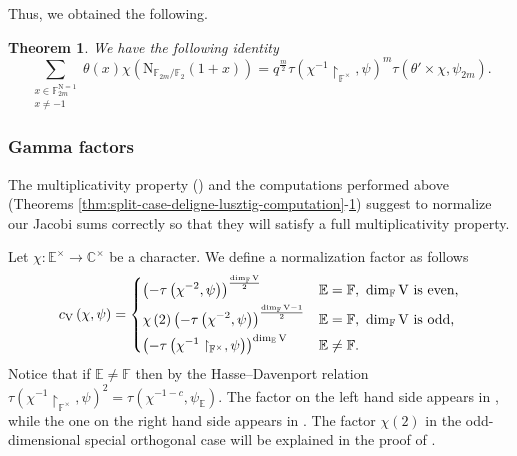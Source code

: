 \documentclass[12pt, reqno]{amsart}
\newtheorem{theorem}{Theorem}[section]
\theoremstyle{definition}
\theoremstyle{definition}
\theoremstyle{definition}
\newcommand{\cComplex}{\mathbb{C}}
\newcommand{\multiplicativegroup}[1]{#1^{\times}}
\newcommand{\hermitianSpace}{\mathrm{V}}
\newcommand{\fieldCharacter}{\psi}
\newcommand{\minusInvolutionMinusOne}[1]{#1^{-1-c}}
\newcommand{\aFieldNorm}{\mathrm{N}}
\newcommand{\finiteField}{\mathbb{F}}
\newcommand{\quadraticExtension}{\mathbb{E}}
\newcommand{\finiteFieldExtension}[1]{\finiteField_{#1}}
\newcommand{\NormOneGroup}[1]{\finiteFieldExtension{#1}^{\aFieldNorm = 1}}
\newcommand{\GaussSumSingleCharacter}[2]{\tau\left(#1, #2\right)}
\newcommand{\GaussSumCharacter}[3]{\tau\left(#1 \times #2, #3\right)}
\begin{document}
Thus, we obtained the following.
\begin{theorem}\label{thm:computation-unitary-norm-one-case}
	We have the following identity $$\sum_{\substack{x \in \NormOneGroup{2m}\\
			x \ne -1}} \theta \left(x\right) \chi\left(\aFieldNorm_{\finiteFieldExtension{2m} \slash \finiteFieldExtension{2}}\left(1 + x\right)\right) = q^{\frac{m}{2}} \GaussSumSingleCharacter{\chi^{-1} \restriction_{\multiplicativegroup{\finiteField}}}{\fieldCharacter}^m \GaussSumCharacter{\theta'}{\chi}{\fieldCharacter_{2m}}.$$
\end{theorem}

\subsubsection{Gamma factors}\label{subsec:normalization-factor}
The multiplicativity property () and the computations performed above (Theorems \ref{thm:split-case-deligne-lusztig-computation}-\ref{thm:computation-unitary-norm-one-case}) suggest to normalize our Jacobi sums correctly so that they will satisfy a full multiplicativity property.

Let $\chi \colon \multiplicativegroup{\quadraticExtension} \to \multiplicativegroup{\cComplex} $ be a character. We define a normalization factor as follows $$c_{\hermitianSpace}\left(\chi, \fieldCharacter\right) = \begin{dcases}
	\left(-\GaussSumSingleCharacter{\chi^{-2}}{\fieldCharacter}\right)^{\frac{\dim_{\finiteField} \hermitianSpace}{2}} & \quadraticExtension = \finiteField,\,\, \dim_{\finiteField} \hermitianSpace \text{ is even,}\\
	\chi\left(2\right) \left(-\GaussSumSingleCharacter{\chi^{-2}}{\fieldCharacter}\right)^{\frac{\dim_{\finiteField} \hermitianSpace - 1}{2}} & \quadraticExtension = \finiteField,\,\, \dim_{\finiteField} \hermitianSpace \text{ is odd,}	\\
	\left(-\GaussSumSingleCharacter{\chi^{-1}\restriction_{\multiplicativegroup{\finiteField}}}{\fieldCharacter}\right)^{\dim_{\quadraticExtension} \hermitianSpace} & \quadraticExtension \ne \finiteField.
\end{dcases}$$
Notice that if $\quadraticExtension \ne \finiteField$ then by the Hasse--Davenport relation $\GaussSumSingleCharacter{\chi^{-1}\restriction_{\multiplicativegroup{\finiteField}}}{\fieldCharacter}^{2} = \GaussSumSingleCharacter{\minusInvolutionMinusOne{\chi}} {\fieldCharacter_{\quadraticExtension}}$. The factor on the left hand side appears in , while the one on the right hand side appears in . The factor $\chi\left(2\right)$ in the odd-dimensional special orthogonal case will be explained in the proof of .
\end{document}
